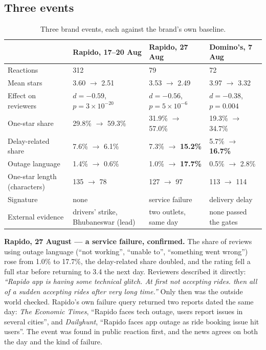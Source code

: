 \documentclass[11pt,a4paper]{article}
\begin{document}
\subsection{Three events}

\begin{table}[htbp]\centering\small
\caption{Three brand events, each against the brand's own baseline.}\label{tab:cases}
\begin{tabularx}{\linewidth}{@{}l X X X@{}}
\toprule
 & Rapido, 17--20 Aug & Rapido, 27 Aug & Domino's, 7 Aug\\
\midrule
Reactions & 312 & 79 & 72\\
Mean stars & 3.60 $\to$ 2.51 & 3.53 $\to$ 2.49 & 3.97 $\to$ 3.32\\
Effect on reviewers & $d=-0.59$, $p=3\times10^{-20}$ & $d=-0.56$, $p=5\times10^{-6}$ & $d=-0.38$, $p=0.004$\\
One-star share & 29.8\% $\to$ 59.3\% & 31.9\% $\to$ 57.0\% & 19.3\% $\to$ 34.7\%\\
Delay-related share & 7.6\% $\to$ 6.1\% & 7.3\% $\to$ \textbf{15.2\%} & 5.7\% $\to$ \textbf{16.7\%}\\
Outage language & 1.4\% $\to$ 0.6\% & 1.0\% $\to$ \textbf{17.7\%} & 0.5\% $\to$ 2.8\%\\
One-star length (characters) & 135 $\to$ 78 & 127 $\to$ 97 & 113 $\to$ 114\\
Signature & none & service failure & delivery delay\\
External evidence & drivers' strike, Bhubaneswar (lead) & two outlets, same day & none passed the gates\\
\bottomrule
\end{tabularx}
\end{table}

\textbf{Rapido, 27 August --- a service failure, confirmed.} The share of reviews using outage language (``not working'', ``unable to'', ``something went wrong'') rose from 1.0\% to 17.7\%, the delay-related share doubled, and the rating fell a full star before returning to 3.4 the next day. Reviewers described it directly: \emph{``Rapido app is having some technical glitch. At first not accepting rides. then all of a sudden accepting rides after very long time.''} Only then was the outside world checked. Rapido's own failure query returned two reports dated the same day: \emph{The Economic Times}, ``Rapido faces tech outage, users report issues in several cities'', and \emph{Dailyhunt}, ``Rapido faces app outage as ride booking issue hit users''. The event was found in public reaction first, and the news agrees on both the day and the kind of failure.
\end{document}
